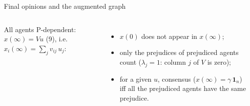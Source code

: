 \documentclass[10pt, aspectratio=169]{beamer}
\begin{document}
\begin{frame}[label=m-fj-final]{Final opinions and the augmented graph}
  \begin{columns}[T]
      \footnotesize
      All agents P-dependent: $x(\infty) = Vu$ (9), i.e.\
      $x_i(\infty) = \sum_{j} v_{ij}\, u_j$:
      \begin{itemize}
        \item $x(0)$ does not appear in $x(\infty)$;
        \item only the prejudices of prejudiced agents count ($\lambda_j = 1$: column $j$
              of $V$ is zero);
        \item for a given $u$, \alert{consensus} ($x(\infty) = \gamma\,\mathbf{1}_n$) iff
              all the prejudiced agents have the same prejudice.
      \end{itemize}

\end{columns}
\end{frame}
\end{document}
